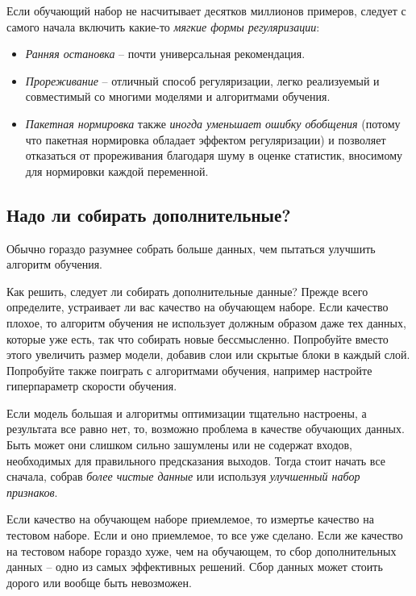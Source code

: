 \documentclass[%
	11pt,
	a4paper,
	utf8,
]{article}
\begin{document}
Если обучающий набор не насчитывает десятков миллионов примеров, следует с самого начала включить какие-то \emph{мягкие формы регуляризации}:
\begin{itemize}
	\item \emph{Ранняя остановка} -- почти универсальная рекомендация.
	
	\item \emph{Прореживание} -- отличный способ регуляризации, легко реализуемый и совместимый со многими моделями и алгоритмами обучения.
	
	\item \emph{Пакетная нормировка} также \emph{иногда уменьшает ошибку обобщения} (потому что пакетная нормировка обладает эффектом регуляризации) и позволяет отказаться от прореживания благодаря шуму в оценке статистик, вносимому для нормировки каждой переменной.
\end{itemize}

\subsection{Надо ли собирать дополнительные?}

Обычно гораздо разумнее собрать больше данных, чем пытаться улучшить алгоритм обучения.

Как решить, следует ли собирать дополнительные данные? Прежде всего определите, устраивает ли вас качество на обучающем наборе. Если качество плохое, то алгоритм обучения не использует должным образом даже тех данных, которые уже есть, так что собирать новые бессмысленно. Попробуйте вместо этого увеличить размер модели, добавив слои или скрытые блоки в каждый слой. Попробуйте также поиграть с алгоритмами обучения, например настройте гиперпараметр скорости обучения.

Если модель большая и алгоритмы оптимизации тщательно настроены, а результата все равно нет, то, возможно проблема в качестве обучающих данных. Быть может они слишком сильно зашумлены или не содержат входов, необходимых для правильного предсказания выходов. Тогда стоит начать все сначала, собрав \emph{более чистые данные} или используя \emph{улучшенный набор признаков}.
  
Если качество на обучающем наборе приемлемое, то измертье качество на тестовом наборе. Если и оно приемлемое, то все уже сделано. Если же качество на тестовом наборе гораздо хуже, чем на обучающем, то сбор дополнительных данных -- одно из самых эффективных решений. Сбор данных может стоить дорого или вообще быть невозможен.
\end{document}
